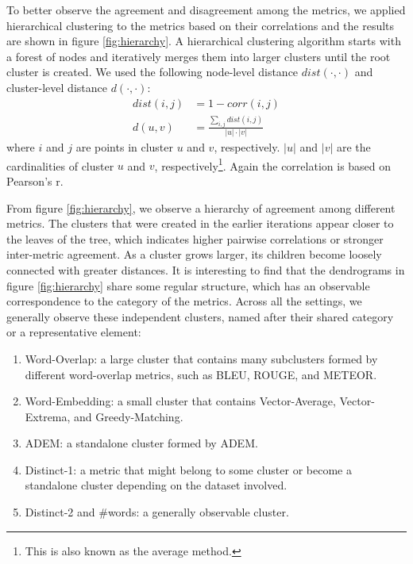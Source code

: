 \documentclass[conference]{IEEEtran}
\begin{document}
To better observe the agreement and disagreement among the metrics, we applied hierarchical clustering to the metrics based on their correlations and the results are shown in figure \ref{fig:hierarchy}. A hierarchical clustering algorithm starts with a forest of nodes and iteratively merges them into larger clusters until the root cluster is created. We used the following node-level distance $\textit{dist}(\cdot, \cdot)$ and cluster-level distance $d(\cdot, \cdot)$:
\begin{align}
    \textit{dist}(i, j) &= 1 - \textit{corr}(i, j) \\
    d(u, v) &= \frac{\sum_{i,j}\textit{dist}(i, j)}{|u| \cdot |v|}
\end{align}
where $i$ and $j$ are points in cluster $u$ and $v$, respectively. $|u|$ and $|v|$ are the cardinalities of cluster $u$ and $v$, respectively\footnote{This is also known as the average method.}. Again the correlation is based on Pearson's r.


From figure \ref{fig:hierarchy}, we observe a hierarchy of agreement among different metrics. The clusters that were created in the earlier iterations appear closer to the leaves of the tree, which indicates higher pairwise correlations or stronger inter-metric agreement. As a cluster grows larger, its children become loosely connected with greater distances. It is interesting to find that the dendrograms in figure \ref{fig:hierarchy} share some regular structure, which has an observable correspondence to the category of the metrics. Across all the settings, we generally observe these independent clusters, named after their shared category or a representative element:
\begin{enumerate}
    \item Word-Overlap: a large cluster that contains many subclusters formed by different word-overlap metrics, such as BLEU, ROUGE, and METEOR.
    \item Word-Embedding: a small cluster that contains Vector-Average, Vector-Extrema, and Greedy-Matching.
    \item ADEM: a standalone cluster formed by ADEM.
    \item Distinct-1: a metric that might belong to some cluster or become a standalone cluster depending on the dataset involved.
    \item Distinct-2 and \#words: a generally observable cluster.
\end{enumerate}
\end{document}

